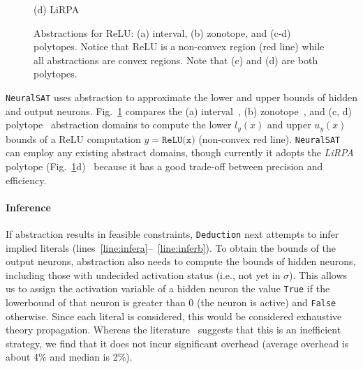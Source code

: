 \documentclass[oneside,11pt,dvipsnames]{book}
\numberwithin{equation}{section}
\theoremstyle{definition}
\theoremstyle{remark}
\newcommand{\hd}[1]{\iftoggle{usecomment}{{\color{blue}{[HD]: #1}}}{}}
\newcommand{\tool}{\texttt{NeuralSAT}}
\begin{document}
\begin{figure}
\begin{minipage}[b]{1\linewidth}
\begin{minipage}[c]{0.24\linewidth}
            \vspace*{-10mm}
            \caption*{(d) LiRPA}
        \end{minipage}
        \vspace*{-3mm}
        \caption{Abstractions for ReLU: (a) interval, (b) zonotope, and (c-d) polytopes. Notice that ReLU is a non-convex region (red line) while all abstractions are convex regions. Note that (c) and (d) are both polytopes.}\label{fig:abs}
    \end{minipage}
\end{figure}

\tool{} uses abstraction to approximate the lower and upper bounds of hidden and output neurons.
Fig.~\ref{fig:abs} compares the (a) interval~\cite{wang2018formal}, (b) zonotope~\cite{singh2018fast}, and (c, d) polytope~\cite{xu2020fast,singh2019abstract,wang2021beta} abstraction domains to compute the lower $l_y(x)$ and upper $u_y(x)$ bounds of a ReLU computation $y=\texttt{ReLU(x)}$ (non-convex red line).
\tool{} can employ any existing abstract domains, though currently it adopts the \emph{LiRPA} polytope (Fig.~\ref{fig:abs}d)~\cite{xu2020fast,xu2020automatic,wang2021beta} because it has a good trade-off between precision and efficiency.


\paragraph{Inference} If abstraction results in feasible constraints, \texttt{Deduction} next attempts to infer implied literals (lines~\ref{line:infera}--~\ref{line:inferb}). To obtain the bounds of the output neurons, abstraction also needs to compute the bounds of hidden neurons, including those with undecided activation status (i.e., not yet in $\sigma$).
This allows us to assign the activation variable of a hidden neuron the value
\texttt{True} if the lowerbound of that neuron is greater than 0 (the neuron is active) and
\texttt{False} otherwise.
Since each literal is considered, this would be considered exhaustive theory propagation.  Whereas the literature~\cite{nieuwenhuis2006solving,kroening2016decision} suggests that this is an inefficient strategy, we find that it does not incur significant overhead (average overhead is about 4\% and median is 2\%).
\end{document}
